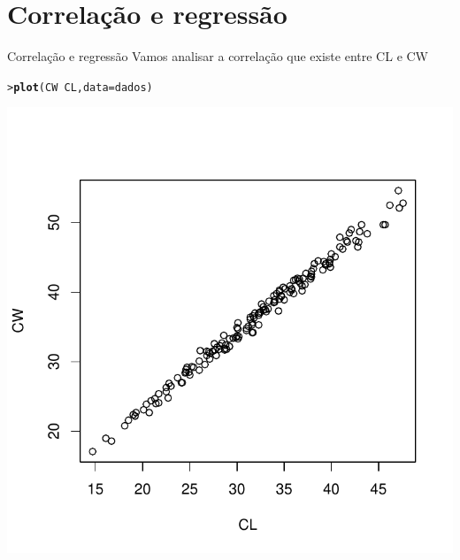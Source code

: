\documentclass[10pt]{beamer}\usepackage[]{graphicx}\usepackage[]{color}
\makeatletter
\newcommand{\hlopt}[1]{\textcolor[rgb]{0,0,0}{#1}}%
\newcommand{\hlstd}[1]{\textcolor[rgb]{0.345,0.345,0.345}{#1}}%
\newcommand{\hlkwc}[1]{\textcolor[rgb]{0.333,0.667,0.333}{#1}}%
\newcommand{\hlkwd}[1]{\textcolor[rgb]{0.282,0.239,0.545}{\textbf{#1}}}%
\newenvironment{kframe}{%
 \def\at@end@of@kframe{}%
 \ifinner\ifhmode%
  \def\at@end@of@kframe{\end{minipage}}%
  \begin{minipage}{\columnwidth}%
 \fi\fi%
 \def\FrameCommand##1{\hskip\@totalleftmargin \hskip-\fboxsep
 \colorbox{shadecolor}{##1}\hskip-\fboxsep
     \hskip-\linewidth \hskip-\@totalleftmargin \hskip\columnwidth}%
 \MakeFramed {\advance\hsize-\width
   \@totalleftmargin\z@ \linewidth\hsize
   \@setminipage}}%
 {\par\unskip\endMakeFramed%
 \at@end@of@kframe}
\newenvironment{knitrout}{}{} %
\makeatother
\begin{document}
\section{Correlação e regressão}

\begin{frame}[fragile=singleslide]{Correlação e regressão}
Vamos analisar a correlação que existe entre CL e CW
\begin{knitrout}\small
{}\color{fgcolor}\begin{kframe}
\begin{alltt}
\hlstd{> }\hlkwd{plot}\hlstd{(CW} \hlopt{~} \hlstd{CL,} \hlkwc{data} \hlstd{= dados)}
\end{alltt}
\end{kframe}

{\centering \includegraphics[width=.6\textwidth]{figure/unnamed-chunk-12} 

}



\end{knitrout}

\end{frame}
\end{document}
